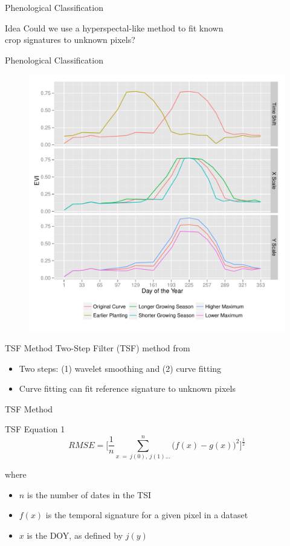 \documentclass[  compress,xcolor={usenames,dvipsnames}]{beamer}
\begin{document}
\begin{frame}{Phenological Classification}
\begingroup
{}
\begin{block}{Idea}
  Could we use a hyperspectal-like method to fit known\\crop signatures to unknown pixels?
\end{block}
\endgroup
\end{frame}

\begin{frame}{Phenological Classification}
\begin{figure}
  \centering
  \includegraphics[width=0.7\linewidth]{Graphics/transformations.pdf}
\end{figure}
\end{frame}

\begin{frame}{TSF Method}
Two-Step Filter (TSF) method from \textcite{sakamoto2010a-two-step}
\begin{itemize}
  \item Two steps: (1) wavelet smoothing and (2) curve fitting
  \item Curve fitting can fit reference signature to unknown pixels
\end{itemize}
\end{frame}

\begin{frame}{TSF Method}
\begin{block}{TSF Equation 1}
  \begin{equation*}
    RMSE = \biggl[\frac{1}{n}\sum_{x\ =\ j(0),\ j(1)\ldots}^{n}\bigl(f\left(x\right)-g\left(x\right)\bigr)^{2}\biggr]^{\frac{1}{2}}
  \end{equation*}
\end{block}
\vspace{0.5\baselineskip}
where
\begin{itemize}
  \item $n$ is the number of dates in the TSI
  \item $f(x)$ is the temporal signature for a given pixel in a dataset
  \item $x$ is the DOY, as defined by $j(y)$
\end{itemize}
\end{frame}
\end{document}
